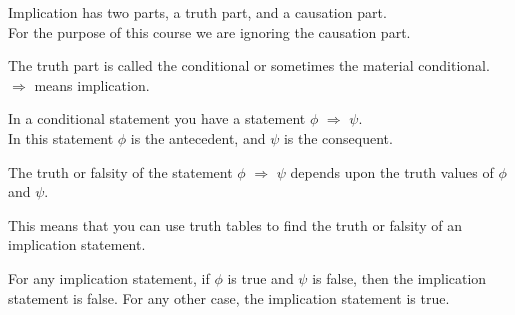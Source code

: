 \documentclass[]{article}
\begin{document}
		\begin{center}
			
				Implication has two parts, a truth part, and a causation part.\\ 
				For the purpose of this course we are ignoring the causation part.\\
				\begin{framed}
					The truth part is called the conditional or sometimes the material conditional.\\
								$\Rightarrow$ means implication.\\
				\end{framed}
			
				In a conditional statement you have a statement $\phi$ $\Rightarrow$ $\psi$.\\
				In this statement $\phi$ is the antecedent, and $\psi$ is the consequent.\\
				\begin{framed}
				The truth or falsity of the statement $\phi$ $\Rightarrow$ $\psi$ depends upon the truth values of $\phi$ and $\psi$.\\
				\end{framed}
				
				This means that you can use truth tables to find the truth or falsity of an implication statement.
				\begin{framed}
				For any implication statement, if $ \phi $ is true and $ \psi $ is false, then the implication statement is false. For any other case, the implication statement is true.
				\end{framed}
				
				
		
		\end{center}
\end{document}

